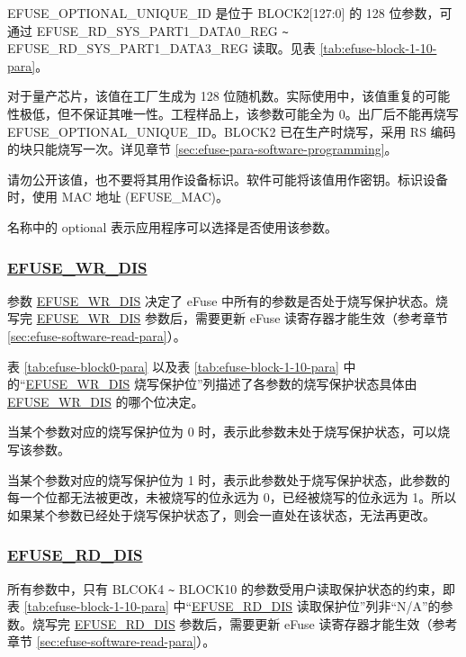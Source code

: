 \documentclass[main\_\_CN.tex]{subfiles}
\begin{document}
EFUSE\_OPTIONAL\_UNIQUE\_ID 是位于 BLOCK2[127:0] 的 128 位参数，可通过 EFUSE\_RD\_SYS\_PART1\_DATA0\_REG \verb+~+ EFUSE\_RD\_SYS\_PART1\_DATA3\_REG 读取。见表 \ref{tab:efuse-block-1-10-para}。

对于量产芯片，该值在工厂生成为 128 位随机数。实际使用中，该值重复的可能性极低，但不保证其唯一性。工程样品上，该参数可能全为 0。出厂后不能再烧写 EFUSE\_OPTIONAL\_UNIQUE\_ID。BLOCK2 已在生产时烧写，采用 RS 编码的块只能烧写一次。详见章节 \ref{sec:efuse-para-software-programming}。

请勿公开该值，也不要将其用作设备标识。软件可能将该值用作密钥。标识设备时，使用 MAC 地址 (EFUSE\_MAC)。

名称中的 optional 表示应用程序可以选择是否使用该参数。

\subsubsection{\hyperref[fielddesc:EFUSEWRDIS]{EFUSE\_WR\_DIS}}
\label{sec:efuse-wr-dis}

参数 \hyperref[fielddesc:EFUSEWRDIS]{EFUSE\_WR\_DIS} 决定了 eFuse 中所有的参数是否处于烧写保护状态。烧写完 \hyperref[fielddesc:EFUSEWRDIS]{EFUSE\_WR\_DIS} 参数后，需要更新 eFuse 读寄存器才能生效（参考章节 \ref{sec:efuse-software-read-para}）。

表 \ref{tab:efuse-block0-para} 以及表 \ref{tab:efuse-block-1-10-para} 中的“\hyperref[fielddesc:EFUSEWRDIS]{EFUSE\_WR\_DIS} 烧写保护位”列描述了各参数的烧写保护状态具体由 \hyperref[fielddesc:EFUSEWRDIS]{EFUSE\_WR\_DIS} 的哪个位决定。

当某个参数对应的烧写保护位为 0 时，表示此参数未处于烧写保护状态，可以烧写该参数。

当某个参数对应的烧写保护位为 1 时，表示此参数处于烧写保护状态，此参数的每一个位都无法被更改，未被烧写的位永远为 0，已经被烧写的位永远为 1。所以如果某个参数已经处于烧写保护状态了，则会一直处在该状态，无法再更改。

\subsubsection{\hyperref[fielddesc:EFUSERDDIS]{EFUSE\_RD\_DIS}}
\label{sec:efuse-rd-dis}

所有参数中，只有 BLCOK4 \verb+~+ BLOCK10 的参数受用户读取保护状态的约束，即表 \ref{tab:efuse-block-1-10-para} 中“\hyperref[fielddesc:EFUSERDDIS]{EFUSE\_RD\_DIS} 读取保护位”列非“N/A”的参数。烧写完 \hyperref[fielddesc:EFUSERDDIS]{EFUSE\_RD\_DIS} 参数后，需要更新 eFuse 读寄存器才能生效（参考章节 \ref{sec:efuse-software-read-para}）。
\end{document}
